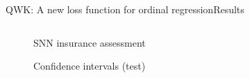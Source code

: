 \documentclass{beamer}
\begin{document}
\begin{frame}{QWK: A new loss function for ordinal regression}{Results}
\begin{columns}
\begin{column}{0.5\textwidth}
			\begin{figure}[p]
				\caption{SNN insurance assessment}
			\end{figure}
			\begin{figure}[p]
				\caption{Confidence intervals (test)}
			\end{figure}
		\end{column}
	\end{columns}	
\end{frame}
\end{document}
